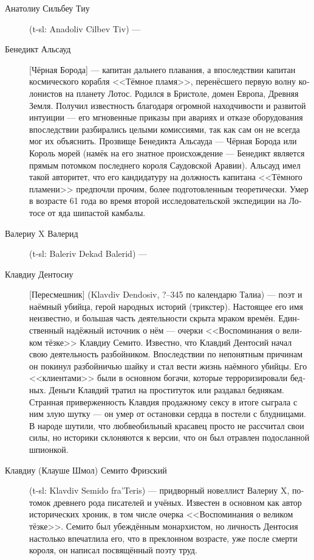 \documentclass[a4paper,12pt,fleqn]{book}\usepackage{polyglossia}\setdefaultlanguage[babelshorthands=true]{russian}\setotherlanguage{english}\defaultfontfeatures{Ligatures=TeX,Mapping=tex-text}\usepackage{xcolor}\newcommand{\ml}[3]{#2}
\begin{document}
{\begin{description}
\item[Анатолиу Сильбеу Тиу] (t-sl: Anadoliv Cilbev Tiv) ---
\item[Бенедикт Альсауд] [Чёрная Борода] --- капитан дальнего плавания, а впоследствии капитан космического корабля <<Тёмное пламя>>, перенёсшего первую волну колонистов на планету Лотос.
Родился в Бристоле, домен Европа, Древняя Земля.
Получил известность благодаря огромной находчивости и развитой интуиции --- его мгновенные приказы при авариях и отказе оборудования впоследствии разбирались целыми комиссиями, так как сам он не всегда мог их объяснить.
Прозвище Бенедикта Альсауда --- Чёрная Борода или Король морей (намёк на его знатное происхождение --- Бенедикт является прямым потомком последнего короля Саудовской Аравии).
Альсауд имел такой авторитет, что его кандидатуру на должность капитана <<Тёмного пламени>> предпочли прочим, более подготовленным теоретически.
Умер в возрасте 61 года во время второй исследовательской экспедиции на Лотосе от яда шипастой камбалы.
\item[Валериу X Валерид] (t-sl: Baleriv Dekad Balerid) ---
\item[Клавдиу Дентосиу] [Пересмешник] (Klavdiv Dendosiv, ?--345 по календарю Талиа) --- поэт и наёмный убийца, герой народных историй (трикстер).
Настоящее его имя неизвестно, и большая часть деятельности скрыта мраком времён.
Единственный надёжный источник о нём --- очерки <<Воспоминания о великом тёзке>> Клавдиу Семито.
Известно, что Клавдий Дентосий начал свою деятельность разбойником.
Впоследствии по непонятным причинам он покинул разбойничью шайку и стал вести жизнь наёмного убийцы.
Его <<клиентами>> были в основном богачи, которые терроризировали бедных.
Деньги Клавдий тратил на проституток или раздавал беднякам.
Странная приверженность Клавдия продажному сексу в итоге сыграла с ним злую шутку --- он умер от остановки сердца в постели с блудницами.
В народе шутили, что любвеобильный красавец просто не рассчитал свои силы, но историки склоняются к версии, что он был отравлен подосланной шпионкой.
\item[Клавдиу (Клауше Шмол) Семито Фризский] (t-sl: Klavdiv Semido fra'Teris) --- придворный новеллист Валериу X, потомок древнего рода писателей и учёных.
Известен в основном как автор исторических хроник, в том числе очерка <<Воспоминания о великом тёзке>>.
Семито был убеждённым монархистом, но личность Дентосия настолько впечатлила его, что в преклонном возрасте, уже после смерти короля, он написал посвящённый поэту труд.

\end{description}}
\end{document}
